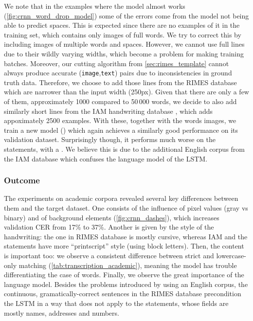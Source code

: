 		We note that in the examples where the model almost works (\autoref{fig:crnn_word_drop_model}) some of the errors come from the model not being able to predict spaces. This is expected since there are no examples of it in the training set, which contains only images of full words. We try to correct this by including images of multiple words and spaces. However, we cannot use full lines due to their wildly varying widths, which become a problem for making training batches. Moreover, our cutting algorithm from \autoref{sec:rimes_template} cannot always produce accurate (\texttt{image},\texttt{text}) pairs due to inconsistencies in ground truth data. Therefore, we choose to add those lines from the RIMES database which are narrower than the input width (250px). Given that there are only a few of them, approximately 1000 compared to 50\,000 words, we decide to also add similarly short lines from the IAM handwriting database \citep{iam}, which adds appoximately 2500 examples. With these, together with the words images, we train a new model () which again achieves a similarly good performance on its validation dataset. Surprisingly though, it performs much worse on the statements, with a . We believe this is due to the additional English corpus from the IAM database which confuses the language model of the LSTM.

		\subsubsection*{Outcome}
		The experiments on academic corpora revealed several key differences between them and the target dataset. One consists of the influence of pixel values (gray vs binary) and of background elements (\autoref{fig:crnn_dashes}), which increases validation CER from 17\% to 37\%. Another is given by the style of the handwriting: the one in RIMES database is mostly cursive, whereas IAM and the statements have more ``printscript'' style (using block letters). Then, the content is important too: we observe a consistent difference between strict and lowercase-only matching (\autoref{tab:transcription_academic}), meaning the model has trouble differentiating the case of words. Finally, we observe the great importance of the language model. Besides the problems introduced by using an English corpus, the continuous, gramatically-correct sentences in the RIMES database precondition the LSTM in a way that does not apply to the statements, whose fields are mostly names, addresses and numbers.

